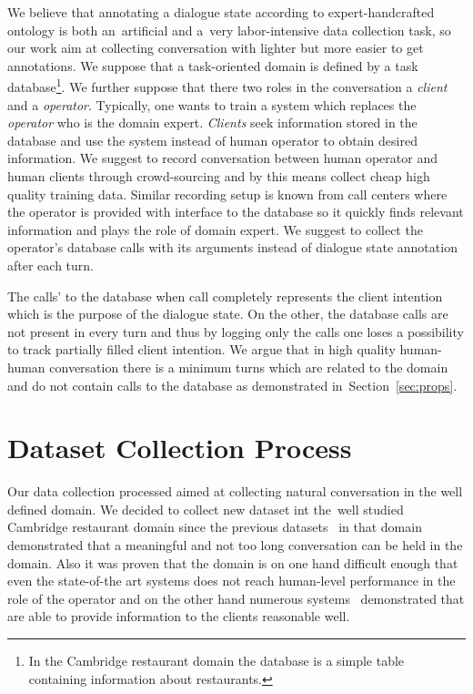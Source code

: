 \documentclass[runningheads,a4paper]{llncs}
\begin{document}
We believe that annotating a dialogue state according to expert-handcrafted ontology is both an~artificial and a~very labor-intensive data collection task, so our work aim at collecting conversation with lighter but more easier to get annotations.
We suppose that a task-oriented  domain is defined by a task database\footnote{In the Cambridge restaurant domain the database is a simple table containing information about restaurants.}. 
We further suppose that there two roles in the conversation a {\it client} and a {\it operator}.
Typically, one wants to train a system which replaces the {\it operator} who is the domain expert.
{\it Clients} seek information stored in the database and use the system instead of human operator to obtain desired information.
We suggest to record conversation between human operator and human clients through crowd-sourcing and by this means collect cheap high quality training data.
Similar recording setup is known from call centers where the operator is provided with interface to the database so it quickly finds relevant information and plays the role of domain expert.
We suggest to collect the operator's database calls with its arguments instead of dialogue state annotation after each turn.

The calls' to the database when call completely represents the client intention which is the purpose of the dialogue state.
On the other, the database calls are not present in every turn and thus by logging only the calls one loses a possibility to track partially filled client intention.
We argue that in high quality human-human conversation there is a minimum turns which are related to the domain and do not contain calls to the database as demonstrated in~Section~\ref{sec:props}.

\section{Dataset Collection Process}
\label{sec:collection}

Our data collection processed aimed at collecting natural conversation in the well defined domain.
We decided to collect new dataset int the~well studied Cambridge restaurant domain since the previous datasets~\cite{williams2013dstc1,henderson2014dstc2,henderson2014dstc3} in that domain demonstrated that a meaningful and not too long conversation can be held in the domain.
Also it was proven that the domain is on one hand difficult enough that even the state-of-the art systems does not reach human-level performance in the role of the operator and on the other hand numerous systems~\cite{young2010hidden,gasic2011line,wen2016network} demonstrated that are able to provide information to the clients reasonable well.
\end{document}
